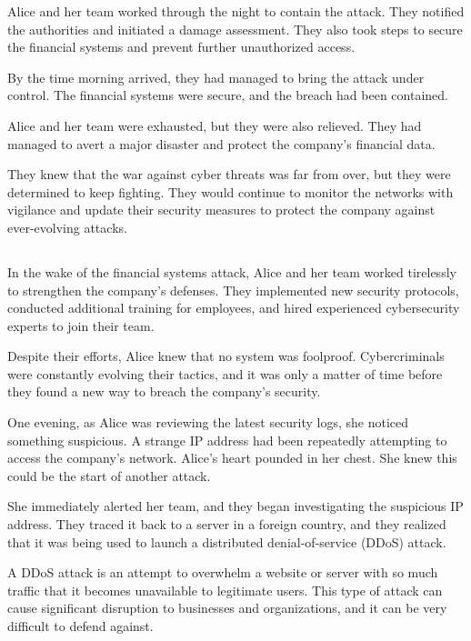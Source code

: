 \documentclass{./StyCls/MyArticle}
\begin{document}
Alice and her team worked through the night to contain the attack. They notified the authorities and initiated a damage assessment. They also took steps to secure the financial systems and prevent further unauthorized access.

By the time morning arrived, they had managed to bring the attack under control. The financial systems were secure, and the breach had been contained.

Alice and her team were exhausted, but they were also relieved. They had managed to avert a major disaster and protect the company's financial data.

They knew that the war against cyber threats was far from over, but they were determined to keep fighting. They would continue to monitor the networks with vigilance and update their security measures to protect the company against ever-evolving attacks.

\subsection{}

In the wake of the financial systems attack, Alice and her team worked tirelessly to strengthen the company's defenses. They implemented new security protocols, conducted additional training for employees, and hired experienced cybersecurity experts to join their team.

Despite their efforts, Alice knew that no system was foolproof. Cybercriminals were constantly evolving their tactics, and it was only a matter of time before they found a new way to breach the company's security.

One evening, as Alice was reviewing the latest security logs, she noticed something suspicious. A strange IP address had been repeatedly attempting to access the company's network. Alice's heart pounded in her chest. She knew this could be the start of another attack.

She immediately alerted her team, and they began investigating the suspicious IP address. They traced it back to a server in a foreign country, and they realized that it was being used to launch a distributed denial-of-service (DDoS) attack.

A DDoS attack is an attempt to overwhelm a website or server with so much traffic that it becomes unavailable to legitimate users. This type of attack can cause significant disruption to businesses and organizations, and it can be very difficult to defend against.
\end{document}
